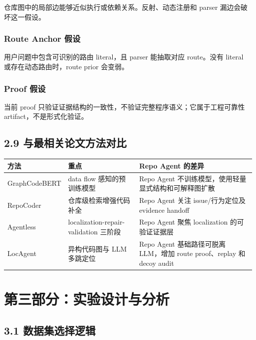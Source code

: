 \documentclass[UTF8,12pt,openany]{ctexbook}
\begin{document}
仓库图中的局部边能够近似执行或依赖关系。反射、动态注册和 parser 漏边会破坏这一假设。\par

\subsection{Route Anchor 假设}

用户问题中包含可识别的路由 literal，且 parser 能抽取对应 route。没有 literal 或存在动态路由时，route prior 会变弱。\par

\subsection{Proof 假设}

当前 proof 只验证证据结构的一致性，不验证完整程序语义；它属于工程可靠性 artifact，不是形式化验证。\par

\section{2.9 与最相关论文方法对比}

\begin{center}
\small
\begin{longtable}{|p{}|p{}|p{}|}
\toprule
方法 & 重点 & Repo Agent 的差异 \\
\midrule
GraphCodeBERT & data flow 感知的预训练模型 & Repo Agent 不训练模型，使用轻量显式结构和可解释图扩散 \\
RepoCoder & 仓库级检索增强代码补全 & Repo Agent 关注 issue/行为定位及 evidence handoff \\
Agentless & localization-repair-validation 三阶段 & Repo Agent 聚焦 localization 的可验证证据层 \\
LocAgent & 异构代码图与 LLM 多跳定位 & Repo Agent 基础路径可脱离 LLM，增加 route proof、replay 和 decoy audit \\
\bottomrule
\end{longtable}
\end{center}

\clearpage
\chapter{第三部分：实验设计与分析}

\section{3.1 数据集选择逻辑}
\end{document}
